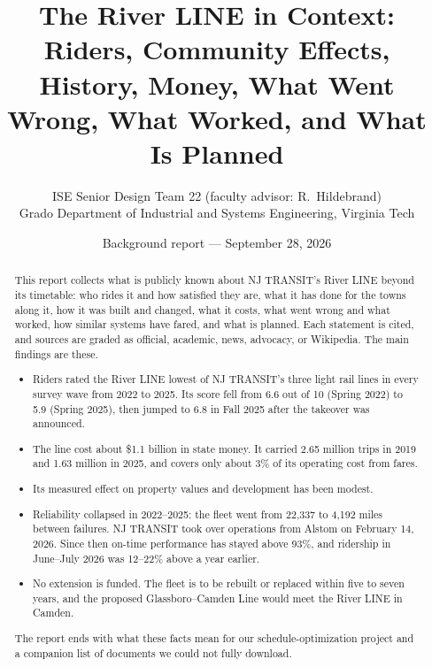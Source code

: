 \documentclass[11pt]{article}
\title{The River LINE in Context:\\
\large Riders, Community Effects, History, Money, What Went Wrong, What Worked, and What Is Planned}
\author{ISE Senior Design Team 22 \quad (faculty advisor: R.~Hildebrand)\\Grado Department of Industrial and Systems Engineering, Virginia Tech}
\date{Background report --- September 28, 2026}
\begin{document}
\maketitle

\begin{abstract}
This report collects what is publicly known about NJ TRANSIT's River LINE beyond its timetable: who rides it and how satisfied they are, what it has done for the towns along it, how it was built and changed, what it costs, what went wrong and what worked, how similar systems have fared, and what is planned. Each statement is cited, and sources are graded as official, academic, news, advocacy, or Wikipedia. The main findings are these.
\begin{itemize}
\item Riders rated the River LINE lowest of NJ TRANSIT's three light rail lines in every survey wave from 2022 to 2025. Its score fell from 6.6 out of 10 (Spring 2022) to 5.9 (Spring 2025), then jumped to 6.8 in Fall 2025 after the takeover was announced.
\item The line cost about \$1.1 billion in state money. It carried 2.65 million trips in 2019 and 1.63 million in 2025, and covers only about 3\% of its operating cost from fares.
\item Its measured effect on property values and development has been modest.
\item Reliability collapsed in 2022--2025: the fleet went from 22{,}337 to 4{,}192 miles between failures. NJ TRANSIT took over operations from Alstom on February 14, 2026. Since then on-time performance has stayed above 93\%, and ridership in June--July 2026 was 12--22\% above a year earlier.
\item No extension is funded. The fleet is to be rebuilt or replaced within five to seven years, and the proposed Glassboro--Camden Line would meet the River LINE in Camden.
\end{itemize}
The report ends with what these facts mean for our schedule-optimization project and a companion list of documents we could not fully download.
\end{abstract}

\tableofcontents
\newpage

\end{document}
